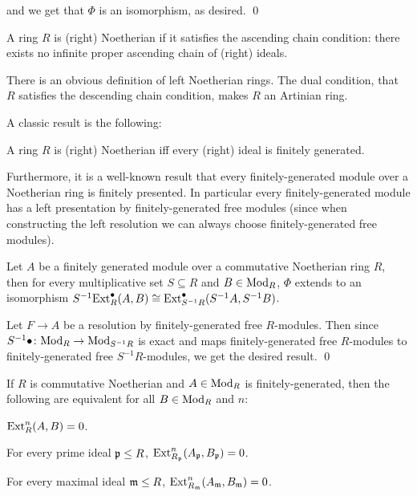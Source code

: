     and we get that $\Phi$ is an isomorphism, as desired.
    \qed

\eproof

\bdefn

    A ring $R$ is {\emphcolor (right) Noetherian} if it satisfies the {\emphcolor ascending chain condition}: there exists no infinite proper ascending chain of (right) ideals.

\edefn

There is an obvious definition of left Noetherian rings.
The dual condition, that $R$ satisfies the {\emphcolor descending chain condition}, makes $R$ an {\emphcolor Artinian ring}.

A classic result is the following:

\blemm

    A ring $R$ is (right) Noetherian iff every (right) ideal is finitely generated.

\elemm

Furthermore, it is a well-known result that every finitely-generated module over a Noetherian ring is finitely presented.
In particular every finitely-generated module has a left presentation by finitely-generated free modules (since when constructing the left resolution we can always choose finitely-generated free modules).

\bprop

    Let $A$ be a finitely generated module over a commutative Noetherian ring $R$, then for every multiplicative set $S\subseteq R$ and $B\in{\rm Mod}_R$,
    $\Phi$ extends to an isomorphism $S^{-1}{\rm Ext}^\bullet_R(A,B)\cong{\rm Ext}^\bullet_{S^{-1}R}(S^{-1}A,S^{-1}B)$.

\eprop

\bproof

    Let $F\to A$ be a resolution by finitely-generated free $R$-modules.
    Then since $S^{-1}\bullet\colon{\rm Mod}_R\to{\rm Mod}_{S^{-1}R}$ is exact and maps finitely-generated free $R$-modules to finitely-generated free $S^{-1}R$-modules, we get the desired result.
    \qed

\eproof

\bcoro[title=Localization for Ext]

    If $R$ is commutative Noetherian and $A\in{\rm Mod}_R$ is finitely-generated, then the following are equivalent for all $B\in{\rm Mod}_R$ and $n$:
    \benum
        \item ${\rm Ext}^n_R(A,B)=0$.
        \item For every prime ideal ${{\frak p}}\leq R$, ${\rm Ext}^n_{R_{{\frak p}}}(A_{{\frak p}},B_{{\frak p}})=0$.
        \item For every maximal ideal ${{\frak m}}\leq R$, ${\rm Ext}^n_{R_{{\frak m}}}(A_{{\frak m}},B_{{\frak m}})=0$.
    \eenum

